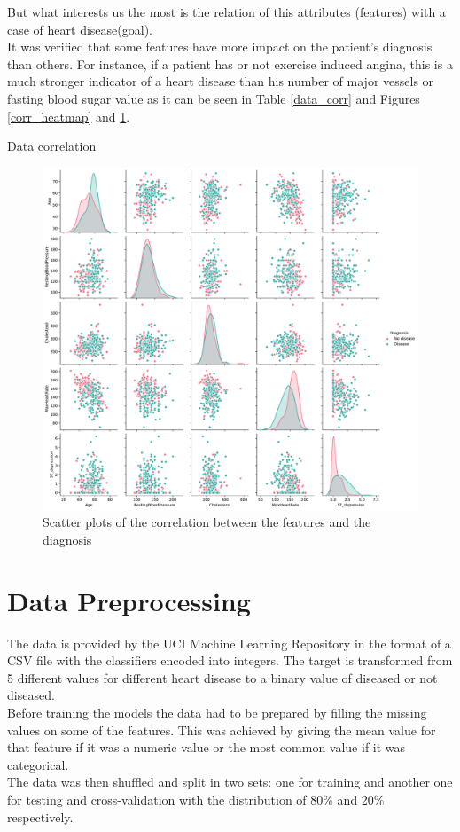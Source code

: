 \documentclass[conference]{IEEEtran}
\begin{document}
But what interests us the most is the relation of this attributes (features) with a case of heart disease(goal).
\\It was verified that some features have more impact on the patient's diagnosis than others. For instance, if a patient has or not exercise induced angina, this is a much stronger indicator of a heart disease than his number of major vessels or fasting blood sugar value as it can be seen in Table \ref{data_corr} and Figures \ref{corr_heatmap} and \ref{corr_scatter}.

\begin{table}[htbp]
    \caption{Data correlation}
    \begin{center}
        
        \label{data_corr}
    \end{center}
\end{table}

\begin{figure}[H]
    \centerline{\includegraphics[width=\linewidth]{images/correlation_scatter.pdf}}
    \caption{Scatter plots of the correlation between the features and the diagnosis}
    \label{corr_scatter}
\end{figure}

\section{Data Preprocessing}
The data is provided by the UCI Machine Learning Repository\cite{mlr} in the format of a CSV file with the classifiers encoded into integers. The target is transformed from 5 different values for different heart disease to a binary value of diseased or not diseased.\\
Before training the models the data had to be prepared by filling the missing values on some of the features. This was achieved by giving the mean value for that feature if it was a numeric value or the most common value if it was categorical.\\
The data was then shuffled and split in two sets: one for training and another one for testing and cross-validation with the distribution of 80\% and 20\% respectively.
\end{document}
